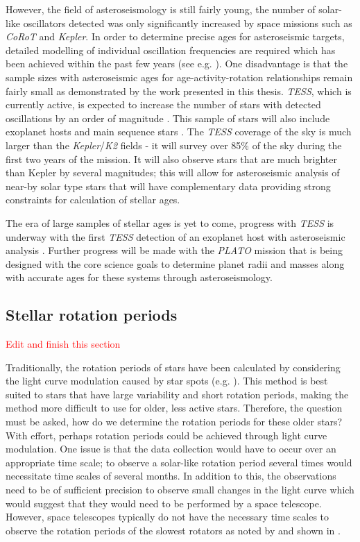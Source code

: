 However, the field of asteroseismology is still fairly young, the number of solar-like oscillators detected was only significantly increased by space missions such as \textit{CoRoT} and \textit{Kepler}. In order to determine precise ages for asteroseismic targets, detailed modelling of individual oscillation frequencies are required which has been achieved within the past few years (see e.g. \citealt{Silva_Aguirre_etal_2017}). One disadvantage is that the sample sizes with asteroseismic ages for age-activity-rotation relationships remain fairly small as demonstrated by the work presented in this thesis. \textit{TESS}, which is currently active, is expected to increase the number of stars with detected oscillations by an order of magnitude \citep{Schofield_etal_2019}. This sample of stars will also include exoplanet hosts and main sequence stars \citep{Campante_etal_2016}. The \textit{TESS} coverage of the sky is much larger than the \textit{Kepler}/\textit{K2} fields - it will survey over 85\% of the sky during the first two years of the mission. It will also observe stars that are much brighter than Kepler by several magnitudes; this will allow for asteroseismic analysis of near-by solar type stars that will have complementary data providing strong constraints for calculation of stellar ages.

The era of large samples of stellar ages is yet to come, progress with \textit{TESS} is underway with the first \textit{TESS} detection of an exoplanet host with asteroseismic analysis \citep{Huber_etal_2019}. Further progress will be made with the \textit{PLATO} mission \citep{Rauer_etal_2014} that is being designed with the core science goals to determine planet radii and masses along with accurate ages for these systems through asteroseismology.

\subsection{Stellar rotation periods}

\textcolor{red}{Edit and finish this section}

Traditionally, the rotation periods of stars have been calculated by considering the light curve modulation caused by star spots (e.g. \citealt{McQuillan_etal_2014}). This method is best suited to stars that have large variability and short rotation periods, making the method more difficult to use for older, less active stars. Therefore, the question must be asked, how do we determine the rotation periods for these older stars? With effort, perhaps rotation periods could be achieved through light curve modulation. One issue is that the data collection would have to occur over an appropriate time scale; to observe a solar-like rotation period several times would necessitate time scales of several months. In addition to this, the observations need to be of sufficient precision to observe small changes in the light curve which would suggest that they would need to be performed by a space telescope. However, space telescopes typically do not have the necessary time scales to observe the rotation periods of the slowest rotators as noted by \citet{Barnes_etal_2016} and shown in \citet{Esselstein_etal_2018}.

